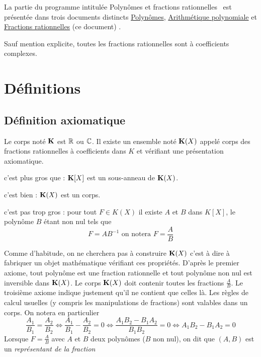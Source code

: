 


La partie du programme intitulée \og Polynômes et fractions rationnelles\fg~ est présentée dans trois documents distincts \href{\baseurl C1622.pdf}{Polynômes}, \href{\baseurl C2160.pdf}{Arithmétique polynomiale} et \href{\baseurl C1623.pdf}{Fractions rationnelles} (ce document) .

Sauf mention explicite, toutes les fractions rationnelles sont à coefficients complexes.

\section{Définitions}
\subsection{Définition axiomatique}
Le corps noté $\mathbf{K}$ est $\mathbb{R}$ ou $\mathbb{C}$. Il existe un ensemble noté $\mathbf{K}(X)$ appelé corps des fractions rationnelles à coefficients dans $K$ et vérifiant une présentation axiomatique.
\begin{pa}
 \item[c'est plus gros que ] : $\mathbf{K}[X]$ est un sous-anneau de $\mathbf{K}(X)$.
 \item[c'est bien ] : $\mathbf{K}(X)$ est un corps.
 \item[c'est pas trop gros] : pour tout $F\in K(X)$ il existe $A$ et $B$ dans $K[X]$, le polynôme $B$ étant non nul tels que
 \begin{displaymath}
   F = A B^{-1}\text{ on notera } F = \frac{A}{B}
 \end{displaymath}
\end{pa}
Comme d'habitude, on ne cherchera pas à construire $\mathbf{K}(X)$ c'est à dire à fabriquer un objet mathématique vérifiant ces propriétés.\newline
D'après le premier axiome, tout polynôme est une fraction rationnelle et tout polynôme non nul est inversible dans $\mathbf{K}(X)$. Le corps $\mathbf{K}(X)$ doit contenir toutes les fractions $\frac{A}{B}$. Le troisième axiome indique justement qu'il ne contient que celles là.\newline
Les règles de calcul usuelles (y compris les manipulations de fractions) sont valables dans un corps. On notera en particulier
\begin{displaymath}
  \frac{A_1}{B_1} = \frac{A_2}{B_2} \Leftrightarrow  \frac{A_1}{B_1} - \frac{A_2}{B_2} = 0 \Leftrightarrow
  \frac{A_1B_2 - B_1A_2}{B_1B_2} = 0 \Leftrightarrow A_1B_2 - B_1A_2 =0
\end{displaymath}
Lorsque $F = \frac{A}{B}$ avec $A$ et $B$ deux polynômes ($B$ non nul), on dit que $(A,B)$ est un \emph{représentant de la fraction} 

